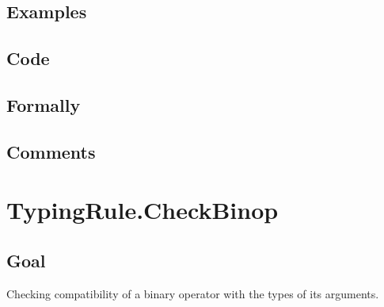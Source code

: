 \documentclass{book}
\begin{document}
  \subsection{Examples}

  \subsection{Code}

  \subsection{Formally}

  \subsection{Comments}

\section{TypingRule.CheckBinop \label{sec:TypingRule.CheckBinop}}

\subsection{Goal}
  Checking compatibility of a binary operator with the types of its arguments.
\end{document}

